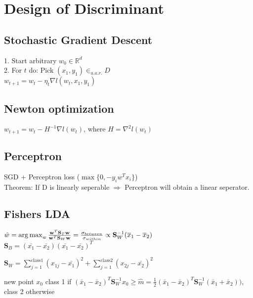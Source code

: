 \section{Design of Discriminant}
\subsection*{Stochastic Gradient Descent}
1. Start arbitrary $w_0 \in \mathbb{R}^d$\\
2. For $t$ do: Pick $(x_1,y_1) \in_{u.a.r.} D$\\
$w_{t+1} = w_t - \eta_t \nabla l(w_t,x_1,y_1)$
\subsection*{Newton optimization}
$w_{t+1} = w_t - H^{-1} \nabla l(w_t)$, where $H=\nabla^2 l(w_t)$
\subsection*{Perceptron}
SGD + Perceptron loss ($\max\{0,-y_i w^T x_i\}$)\\
Theorem: If D is linearly seperable $\Rightarrow$ Perceptron
will obtain a linear seperator.
\subsection*{Fishers LDA}
$\hat{w} = \operatorname*{arg\,max}_{w} \frac{\mathbf{w}^T\mathbf{S}_T\mathbf{w}}{\mathbf{w}^T\mathbf{S}_W\mathbf{w}} =\frac{\sigma_{between}}{\sigma_{within}} \propto \mathbf{S}_W^{-1}(\overline{x}_1-\overline{x}_2)$\\
$\mathbf{S}_B = (\bar{x_1}-\bar{x_2}) (\bar{x_1}-\bar{x_2})^T$

$\mathbf{S}_W = \sum_{j=1}^{\text{class1}} (x_{1j}-\bar{x_1})^2 + \sum_{j=1}^{\text{class2}} (x_{2j}-\bar{x_2})^2$

new point $x_0$ class 1 if $(\bar{x}_1-\bar{x}_2)^T \mathbf{S}_W^{-1} x_0 \geq \hat{m} = \frac{1}{2} (\bar{x}_1-\bar{x}_2)^T \mathbf{S}_W^{-1} (\bar{x}_1+\bar{x}_2))$, class 2 otherwise